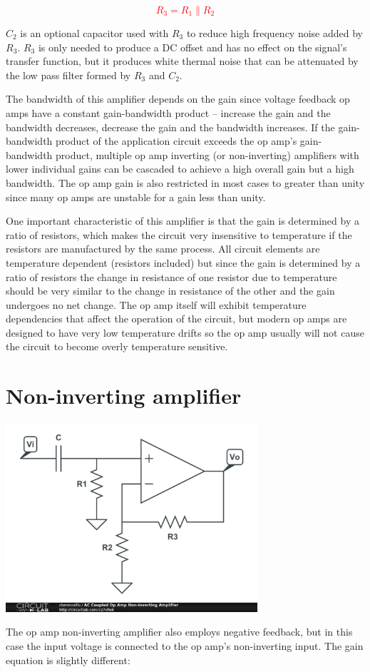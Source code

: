 \textcolor{red}{
\begin{equation}
R_3 = R_1 \parallel R_2
\end{equation}
}

$C_2$ is an optional capacitor used with $R_3$ to reduce high frequency noise added by $R_3$.
$R_3$ is only needed to produce a DC offset and has no effect on the signal's transfer function, but it produces white thermal noise that can be attenuated by the low pass filter formed by $R_3$ and $C_2$.

The bandwidth of this amplifier depends on the gain since voltage feedback op amps have a constant gain-bandwidth product -- increase the gain and the bandwidth decreases, decrease the gain and the bandwidth increases.
If the gain-bandwidth product of the application circuit exceeds the op amp's gain-bandwidth product, multiple op amp inverting (or non-inverting) amplifiers with lower individual gains can be cascaded to achieve a high overall gain but a high bandwidth.
The op amp gain is also restricted in most cases to greater than unity since many op amps are unstable for a gain less than unity.

One important characteristic of this amplifier is that the gain is determined by a ratio of resistors, which makes the circuit very insensitive to temperature if the resistors are manufactured by the same process.
All circuit elements are temperature dependent (resistors included) but since the gain is determined by a ratio of resistors the change in resistance of one resistor due to temperature should be very similar to the change in resistance of the other and the gain undergoes no net change.
The op amp itself will exhibit temperature dependencies that affect the operation of the circuit, but modern op amps are designed to have very low temperature drifts so the op amp usually will not cause the circuit to become overly temperature sensitive.

\section{Non-inverting amplifier}
\begin{center}
\includegraphics[width=0.70\textwidth]{schematics/noninvertingopampamplifier.PNG}
\end{center}
The op amp non-inverting amplifier also employs negative feedback, but in this case the input voltage is connected to the op amp's non-inverting input. The gain equation is slightly different:

